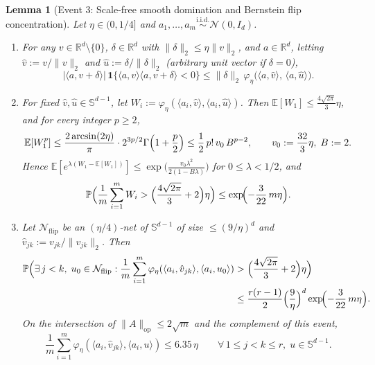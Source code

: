 \documentclass[11pt]{article}
\theoremstyle{plain}
\newtheorem{lemma}[theorem]{Lemma}
\theoremstyle{remark}
\numberwithin{equation}{section}
\newcommand{\R}{\mathbb{R}}
\newcommand{\E}{\mathbb{E}}
\newcommand{\Prob}{\mathbb{P}}
\newcommand{\Sph}{\mathbb{S}}
\newcommand{\ind}{\mathbf{1}}
\newcommand{\ip}[2]{\langle #1, #2 \rangle}
\newcommand{\norm}[1]{\|#1\|}
\newcommand{\opnorm}[1]{\|#1\|_{\mathrm{op}}}
\begin{document}
\begin{lemma}[Event 3: Scale-free smooth domination and Bernstein flip concentration]
  \label{lem:flip-conc}
  Let $\eta \in (0, 1/4]$ and $a_1, \dots, a_m \stackrel{\mathrm{i.i.d.}}{\sim} \mathcal{N}(0, I_d)$.
  \begin{enumerate}[label=(\alph*)]
    \item For any $v \in \R^d \setminus \{0\}$, $\delta \in \R^d$ with $\norm{\delta}_2 \le \eta\norm{v}_2$, and $a \in \R^d$, letting $\hat v := v/\norm{v}_2$ and $\hat u := \delta/\norm{\delta}_2$ (arbitrary unit vector if $\delta = 0$),
    \begin{equation}
      \label{eq:phi-dom}
      |\ip{a}{v + \delta}|\,\ind\bigl\{\ip{a}{v}\ip{a}{v + \delta} < 0\bigr\}
      \le \norm{\delta}_2\,\varphi_\eta\bigl(\ip{a}{\hat v},\, \ip{a}{\hat u}\bigr).
    \end{equation}
    \item For fixed $\hat v, \hat u \in \Sph^{d-1}$, let $W_i := \varphi_\eta(\ip{a_i}{\hat v}, \ip{a_i}{\hat u})$. Then $\E[W_1] \le \frac{4\sqrt{2\pi}}{3}\eta$, and for every integer $p \ge 2$,
    \[
      \E[W_1^p] \le \frac{2\arcsin(2\eta)}{\pi}\cdot 2^{3p/2}\Gamma\Bigl(1 + \frac{p}{2}\Bigr)
      \le \frac{1}{2}\,p!\,v_0\,B^{p - 2},
      \qquad v_0 := \frac{32}{3}\eta,\; B := 2.
    \]
    Hence $\E[e^{\lambda(W_1 - \E[W_1])}] \le \exp\bigl(\frac{v_0\lambda^2}{2(1 - B\lambda)}\bigr)$ for $0 \le \lambda < 1/2$, and
    \[
      \Prob\Bigl(\frac{1}{m}\sum_{i=1}^m W_i > \Bigl(\frac{4\sqrt{2\pi}}{3} + 2\Bigr)\eta\Bigr)
      \le \exp\!\Bigl(-\frac{3}{22}\,m\eta\Bigr).
    \]
    \item Let $\mathcal{N}_{\mathrm{flip}}$ be an $(\eta/4)$-net of $\Sph^{d-1}$ of size $\le (9/\eta)^d$ and $\hat v_{jk} := v_{jk}/\norm{v_{jk}}_2$. Then
    \begin{align*}
      \Prob\Bigl(\exists\, j < k,\; u_0 \in \mathcal{N}_{\mathrm{flip}} :
        \frac{1}{m}\sum_{i=1}^m \varphi_\eta(\ip{a_i}{\hat v_{jk}}, \ip{a_i}{u_0})
        &> \Bigl(\frac{4\sqrt{2\pi}}{3} + 2\Bigr)\eta\Bigr) \\
      &\le \frac{r(r-1)}{2}\Bigl(\frac{9}{\eta}\Bigr)^d \exp\!\Bigl(-\frac{3}{22}\,m\eta\Bigr).
    \end{align*}
    On the intersection of $\opnorm{A} \le 2\sqrt{m}$ and the complement of this event,
    \[
      \frac{1}{m}\sum_{i=1}^m \varphi_\eta(\ip{a_i}{\hat v_{jk}}, \ip{a_i}{u}) \le 6.35\,\eta
      \qquad \forall\, 1 \le j < k \le r,\; u \in \Sph^{d-1}.
    \]
  \end{enumerate}
\end{lemma}
\end{document}
